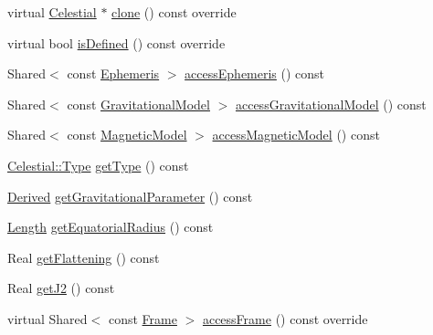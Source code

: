 \begin{DoxyCompactItemize}
\item 
virtual \hyperlink{classlibrary_1_1physics_1_1env_1_1obj_1_1_celestial}{Celestial} $\ast$ \hyperlink{classlibrary_1_1physics_1_1env_1_1obj_1_1_celestial_aaf8aa41a0ff9336eba62c07e3c27f82d}{clone} () const override
\item 
virtual bool \hyperlink{classlibrary_1_1physics_1_1env_1_1obj_1_1_celestial_a2b16a76f609891450356457de13c26d8}{is\+Defined} () const override
\item 
Shared$<$ const \hyperlink{classlibrary_1_1physics_1_1env_1_1_ephemeris}{Ephemeris} $>$ \hyperlink{classlibrary_1_1physics_1_1env_1_1obj_1_1_celestial_ab56fff3f2f1508dee79fa7410d67e300}{access\+Ephemeris} () const
\item 
Shared$<$ const \hyperlink{namespacelibrary_1_1physics_1_1env_1_1obj_ade509c84a4970a3420c03c058ada152a}{Gravitational\+Model} $>$ \hyperlink{classlibrary_1_1physics_1_1env_1_1obj_1_1_celestial_acbb834f37fa8f0fc7868d41ebb5173ee}{access\+Gravitational\+Model} () const
\item 
Shared$<$ const \hyperlink{namespacelibrary_1_1physics_1_1env_1_1obj_a86d4e595a77f8bd5ed03ecd32c3a80de}{Magnetic\+Model} $>$ \hyperlink{classlibrary_1_1physics_1_1env_1_1obj_1_1_celestial_a1b5a40c4b9e2824bf8025e945f09c3ef}{access\+Magnetic\+Model} () const
\item 
\hyperlink{classlibrary_1_1physics_1_1env_1_1obj_1_1_celestial_aab1f58aa727e639288d65f3d33c4f245}{Celestial\+::\+Type} \hyperlink{classlibrary_1_1physics_1_1env_1_1obj_1_1_celestial_ae020ad574249ea82679347c0a6933355}{get\+Type} () const
\item 
\hyperlink{classlibrary_1_1physics_1_1units_1_1_derived}{Derived} \hyperlink{classlibrary_1_1physics_1_1env_1_1obj_1_1_celestial_a2e8341c35d9c4c07eed4ce9aa5d9acc2}{get\+Gravitational\+Parameter} () const
\item 
\hyperlink{classlibrary_1_1physics_1_1units_1_1_length}{Length} \hyperlink{classlibrary_1_1physics_1_1env_1_1obj_1_1_celestial_a7dd4326ff317292262d1a9adf8887cfe}{get\+Equatorial\+Radius} () const
\item 
Real \hyperlink{classlibrary_1_1physics_1_1env_1_1obj_1_1_celestial_aac48ed47a25a10c120f066995dc3c6d4}{get\+Flattening} () const
\item 
Real \hyperlink{classlibrary_1_1physics_1_1env_1_1obj_1_1_celestial_a3740b398dca520bd50862f67c29ab8e7}{get\+J2} () const
\item 
virtual Shared$<$ const \hyperlink{classlibrary_1_1physics_1_1coord_1_1_frame}{Frame} $>$ \hyperlink{classlibrary_1_1physics_1_1env_1_1obj_1_1_celestial_a6649bfe0bf0795aa4def046a8c38aef5}{access\+Frame} () const override

\end{DoxyCompactItemize}
